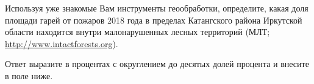 
Используя уже знакомые Вам инструменты геообработки, определите, какая доля площади гарей от 
пожаров 2018 года в пределах Катангского района Иркутской области находится внутри малонарушенных 
лесных территорий (МЛТ; \url{http://www.intactforests.org}).

Ответ выразите в процентах с округлением до десятых долей процента и внесите в поле ниже. 